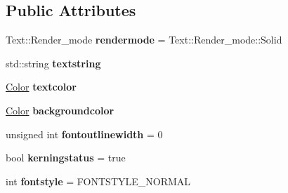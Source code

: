 \subsection*{Public Attributes}
\begin{DoxyCompactItemize}
\item 
\mbox{\label{structjetfuel_1_1draw_1_1Text_1_1Text__characteristics_a935e0768c20e9f13fe698a84f89e819e}} 
Text\+::\+Render\+\_\+mode {\bfseries rendermode} = Text\+::\+Render\+\_\+mode\+::\+Solid
\item 
\mbox{\label{structjetfuel_1_1draw_1_1Text_1_1Text__characteristics_aaf18b9afa8d0b53d5a33e7a2cd920635}} 
std\+::string {\bfseries textstring}
\item 
\mbox{\label{structjetfuel_1_1draw_1_1Text_1_1Text__characteristics_a6ead76d8ef940be306e293c641fc6399}} 
\hyperlink{classjetfuel_1_1draw_1_1Color}{Color} {\bfseries textcolor}
\item 
\mbox{\label{structjetfuel_1_1draw_1_1Text_1_1Text__characteristics_a642945e04c02edf4c716854d5707ac47}} 
\hyperlink{classjetfuel_1_1draw_1_1Color}{Color} {\bfseries backgroundcolor}
\item 
\mbox{\label{structjetfuel_1_1draw_1_1Text_1_1Text__characteristics_adcf1715df16a9e9534c7ae76e7acc3b7}} 
unsigned int {\bfseries fontoutlinewidth} = 0
\item 
\mbox{\label{structjetfuel_1_1draw_1_1Text_1_1Text__characteristics_a3dffc43bd5ef676e1392ae0baf82f52f}} 
bool {\bfseries kerningstatus} = true
\item 
\mbox{\label{structjetfuel_1_1draw_1_1Text_1_1Text__characteristics_a8894b9988b465279bf61069386308c60}} 
int {\bfseries fontstyle} = F\+O\+N\+T\+S\+T\+Y\+L\+E\+\_\+\+N\+O\+R\+M\+AL
\item 
\mbox{\label{structjetfuel_1_1draw_1_1Text_1_1Text__characteristics_ae4065d3d8f9523f6d0f3b9e9c37ca7cc}} 

\end{DoxyCompactItemize}
